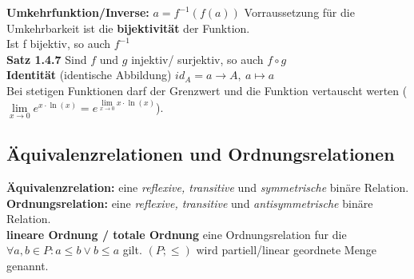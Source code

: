 \textbf{Umkehrfunktion/Inverse:} $a = f^{-1}(f(a))$ Vorraussetzung für die Umkehrbarkeit ist die \textbf{bijektivität} der Funktion.\\
Ist f bijektiv, so auch $f^{-1}$\\

\textbf{Satz 1.4.7} Sind $f$ und $g$ injektiv/ surjektiv, so auch $f\circ g$\\

\textbf{Identität} (identische Abbildung) $id_A=a\rightarrow A, \ a\mapsto a$\\

Bei stetigen Funktionen darf der Grenzwert und die Funktion vertauscht werten ($\lim\limits_{x\to 0 }e^{x\cdot \ln (x)}=e^{\lim\limits_{x\to 0 }x\cdot \ln(x)}$).

\subsection{Äquivalenzrelationen und Ordnungsrelationen}

\textbf{Äquivalenzrelation:} eine \textit{reflexive, transitive} und \textit{symmetrische} binäre Relation.\\

\textbf{Ordnungsrelation:} eine \textit{reflexive, transitive} und \textit{antisymmetrische} binäre Relation.\\

\textbf{lineare Ordnung / totale Ordnung} eine Ordnungsrelation fur die $\forall a,b\in P : a\leq b \lor b\leq a$ gilt. $(P;\leq)$ wird partiell/linear geordnete Menge genannt.\\



